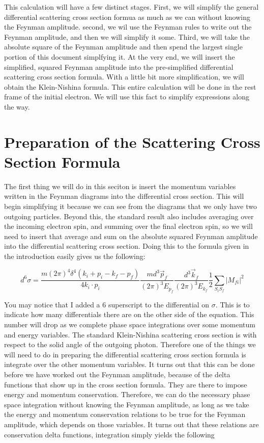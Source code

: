 \documentclass[a4]{article}
\begin{document}
    This calculation will have a few distinct stages. First, we will simplify the general differential scattering cross section formua as much
    as we can without knowing the Feynman amplitude. second, we wil use the Feynman rules to write out the Feynman amplitude,
    and then we will simplify it some. Third, we will take the absolute square of the Feynman amplitude and then spend the largest
    single portion of this document simplfying it. At the very end, we will insert the simplified, squared Feynman amplitude into the
    pre-simplified differential scattering cross section formula. With a little bit more simplification, we will obtain the Klein-Nishina
    formula. This entire calculation will be done in the rest frame of the initial electron. We will use this fact to simplify expressions
    along the way.

    \section*{Preparation of the Scattering Cross Section Formula}

    The first thing we will do in this seciton is insert the momentum variables written in the Feynman diagrams into the differential
    cross section. This will begin simplifying it because we can see from the diagrams that we only have two outgoing
    particles. Beyond this, the standard result also includes averaging over the incoming electron spin, and summing over the final
    electron spin, so we will need to insert that average and sum on the absolute squared Feynman amplitude into the differential
    scattering cross section. Doing this to the formula given in the introduction easily gives us the following:

    \begin{equation}
        d^6 \sigma = \frac{m (2 \pi)^4 \delta^4 (k_i + p_i - k_f - p_f)}{4 k_i \cdot p_i} \frac{m d^3 \vec{p}_f}{(2 \pi)^3 E_{p_f}} \frac{d^3 \vec{k}_f}{(2 \pi)^3 E_{k_f}} \frac{1}{2} \sum_{S_i S_f} |M_{fi}|^2
    \end{equation}

    You may notice that I added a 6 superscript to the differential on $\sigma$. This is to indicate how many differentials there are on the other
    side of the equation. This number will drop as we complete phase space integrations over some momentum and energy
    variables.
    The standard Klein-Nishina scattering cross section is with respect to the solid angle of the outgoing photon. Therefore one of the
    things we will need to do in preparing the differential scattering cross section formula is integrate over the other momentum
    variables. It turns out that this can be done before we have worked out the Feynman amplitude, because of the delta functions that
    show up in the cross section formula. They are there to impose energy and momentum conservation. Therefore, we can do the 
    necessary phase space integration without knowing the Feynman amplitude, as long as we take the energy and momentum
    conservation relations to be true for the Feynman amplitude, which depends on those variables. It turns out that these relations are
    conservation delta functions, integration simply yields the following
\end{document}
